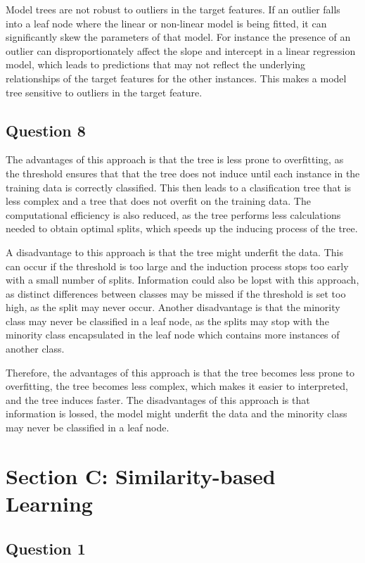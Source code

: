 \documentclass[10pt]{article}
\begin{document}
Model trees are not robust to outliers in the target features. If an outlier falls into a leaf node where the
linear or non-linear model is being fitted, it can significantly skew the parameters of that model. For instance
the presence of an outlier can disproportionately affect the slope and intercept in a linear regression model, which leads to
predictions that may not reflect the underlying relationships of the target features for the other instances. This makes a model
tree sensitive to outliers in the target feature.

\subsection*{Question 8}

The advantages of this approach is that the tree is less prone to overfitting, as the threshold
ensures that that the tree does not induce until each instance in the training data is correctly
classified. This then leads to a clasification tree that is less complex and a tree that does not
overfit on the training data. The computational efficiency is also reduced, as the tree performs
less calculations needed to obtain optimal splits, which speeds up the inducing process of the tree.

A disadvantage to this approach is that the tree might underfit the data. This can occur if the
threshold is too large and the induction process stops too early with a small number of splits.
Information could also be lopst with this approach, as distinct differences between classes may be missed
if the threshold is set too high, as the split may never occur. Another disadvantage is that the minority
class may never be classified in a leaf node, as the splits may stop with the minority class encapsulated in the leaf node
which contains more instances of another class.

Therefore, the advantages of this approach is that the tree becomes less prone to overfitting, the
tree becomes less complex, which makes it easier to interpreted, and the tree induces faster. The disadvantages
of this approach is that information is lossed, the model might underfit the data and the minority class
may never be classified in a leaf node.

\section*{Section C: Similarity-based Learning}

\subsection*{Question 1}
\end{document}
